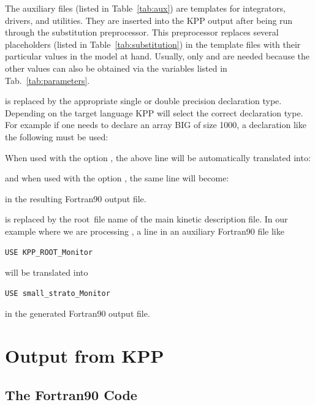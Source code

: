 \documentclass[twoside]{article}
\newcommand{\kpproot}{{\sc root}}
\begin{document}
The auxiliary files (listed in Table~\ref{tab:aux}) are templates for
integrators, drivers, and utilities. They are inserted into the KPP
output after being run through the substitution preprocessor. This
preprocessor replaces several placeholders (listed in
Table~\ref{tab:substitution}) in the template files with their
particular values in the model at hand. Usually, only 
and  are needed because the other values can also be
obtained via the variables listed in Tab.~\ref{tab:parameters}.

 is replaced by the appropriate single or double
precision declaration type. Depending on the target language KPP will
select the correct declaration type. For example if one needs to declare
an array BIG of size 1000, a declaration like the following must be
used:


When used with the option  , the above line
will be automatically translated into:


and when used with the option  , the same
line will become:


in the resulting Fortran90 output file.

 is replaced by the \kpproot\ file name of the main
kinetic description file. In our example where we are processing
, a line in an auxiliary Fortran90 file like
%
\begin{verbatim}
USE KPP_ROOT_Monitor
\end{verbatim}
%
will be translated into
%
\begin{verbatim}
USE small_strato_Monitor
\end{verbatim}
%
in the generated Fortran90 output file.

\section{Output from KPP}
\label{sec:output}

\subsection{The Fortran90 Code}
\end{document}
